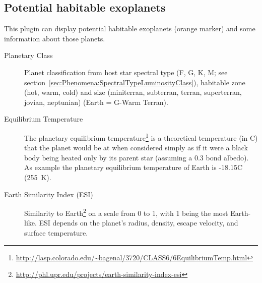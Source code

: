 \subsection{Potential habitable exoplanets}
\label{sec:plugins:Exoplanets:habitable}
This plugin can display potential habitable exoplanets (orange marker) and some information about those planets.

\begin{description}
\item[Planetary Class] Planet classification from host star spectral
  type (F, G, K, M; see
  section~\ref{sec:Phenomena:SpectralTypeLuminosityClass}), habitable
  zone (hot, warm, cold) and size (miniterran, subterran, terran,
  superterran, jovian, neptunian) (Earth = G-Warm Terran).
\item[Equilibrium Temperature] The planetary equilibrium
  temperature\footnote{\url{http://lasp.colorado.edu/~bagenal/3720/CLASS6/6EquilibriumTemp.html}}
  is a theoretical temperature (in \degree C) that the planet would be
  at when considered simply as if it were a black body being heated
  only by its parent star (assuming a 0.3 bond albedo). As example the
  planetary equilibrium temperature of Earth is -18.15\degree C (255~K).
\item[Earth Similarity Index (ESI)] Similarity to
  Earth\footnote{\url{http://phl.upr.edu/projects/earth-similarity-index-esi}}
  on a scale from 0 to 1, with 1 being the most Earth-like. ESI
  depends on the planet's radius, density, escape velocity, and
  surface temperature.
\end{description}

